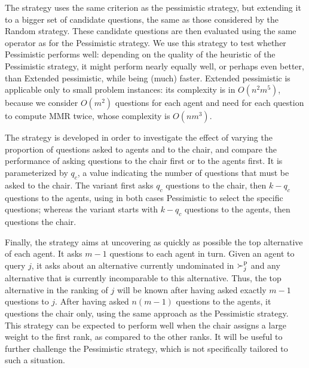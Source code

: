 \documentclass{article}
\begin{document}
The  strategy uses the same criterion as the pessimistic strategy, but extending it to a bigger set of candidate questions, the same as those considered by the Random strategy. These candidate questions are then evaluated using the same operator as for the Pessimistic strategy.
We use this strategy to test whether Pessimistic performs well: depending on the quality of the heuristic of the Pessimistic strategy, it might perform nearly equally well, or perhaps even better, than Extended pessimistic, while being (much) faster. Extended pessimistic is applicable only to small problem instances: its complexity is in $O(n^2 m^5)$, because we consider $O(m^2)$ questions for each agent and need for each question to compute MMR twice, whose complexity is $O(nm^3)$.

The  strategy is developed in order to investigate the effect of varying the proportion of questions asked to agents and to the chair, and compare the performance of asking questions to the chair first or to the agents first. It is parameterized by $q_c$, a value indicating the number of questions that must be asked to the chair.
The  variant first asks $q_c$ questions to the chair, then $k - q_c$ questions to the agents, using in both cases Pessimistic to select the specific questions; whereas the  variant starts with $k - q_c$ questions to the agents, then questions the chair. 

Finally, the  strategy aims at uncovering as quickly as possible the top alternative of each agent. It asks $m - 1$ questions to each agent in turn. 
Given an agent to query $j$, it asks about an alternative currently undominated in $\succ^\text{p}_j$ and any alternative that is currently incomparable to this alternative. Thus, the top alternative in the ranking of $j$ will be known after having asked exactly $m-1$ questions to $j$.
After having asked $n (m-1)$ questions to the agents, it questions the chair only, using the same approach as the Pessimistic strategy.
This strategy can be expected to perform well when the chair assigns a large weight to the first rank, as compared to the other ranks. It will be useful to further challenge the Pessimistic strategy, which is not specifically tailored to such a situation.
\end{document}

